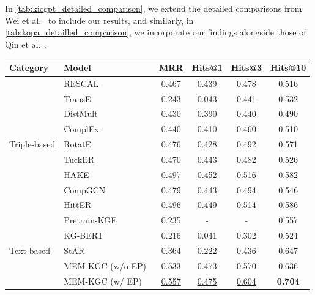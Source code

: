 \documentclass[12pt,a4paper]{article}
\begin{document}
In \cref{tab:kicgpt_detailed_comparison}, we extend the detailed comparisons from Wei et al.~\cite{wei2023kicgpt} to include our results, and similarly, in \cref{tab:kopa_detailled_comparison}, we incorporate our findings alongside those of Qin et al.~\cite{qin2023kopa}.

\begin{table}
    \centering
    \begin{tabular}{l|l|c|c|c|c|}
        \toprule
        \textbf{Category} & \textbf{Model}                           & \textbf{MRR}      & \textbf{Hits@1}   & \textbf{Hits@3}   & \textbf{Hits@10}  \\
        \midrule

        \multirow{9}{*}{Triple-based}
        & RESCAL~\cite{nickel2011three}            & 0.467             & 0.439             & 0.478             & 0.516             \\
        & TransE~\cite{bordes2013translating}      & 0.243             & 0.043             & 0.441             & 0.532             \\
        & DistMult~\cite{yang2014embedding}        & 0.430             & 0.390             & 0.440             & 0.490             \\
        & ComplEx~\cite{trouillon2016complex}      & 0.440             & 0.410             & 0.460             & 0.510             \\
        & RotatE~\cite{sun2019rotate}              & 0.476             & 0.428             & 0.492             & 0.571             \\
        & TuckER~\cite{balavzevic2019tucker}       & 0.470             & 0.443             & 0.482             & 0.526             \\
        & HAKE~\cite{zhang2020learning}            & 0.497             & 0.452             & 0.516             & 0.582             \\
        & CompGCN~\cite{vashishth2019composition}  & 0.479             & 0.443             & 0.494             & 0.546             \\
        & HittER~\cite{chen-etal-2021-hitter}      & 0.496             & 0.449             & 0.514             & 0.586             \\
        \midrule

        \multirow{5}{*}{Text-based}
        & Pretrain-KGE~\cite{zhang2020pretrain}    & 0.235             & -                 & -                 & 0.557             \\
        & KG-BERT~\cite{yao2019kgbert}             & 0.216             & 0.041             & 0.302             & 0.524             \\
        & StAR~\cite{wang2021structure}            & 0.364             & 0.222             & 0.436             & 0.647             \\
        & MEM-KGC (w/o EP)~\cite{choi2021mem}      & 0.533             & 0.473             & 0.570             & 0.636             \\
        & MEM-KGC (w/ EP)~\cite{choi2021mem}       & \underline{0.557} & \underline{0.475} & \underline{0.604} & \textbf{0.704} \\
        \midrule


\end{tabular}
\end{table}
\end{document}
